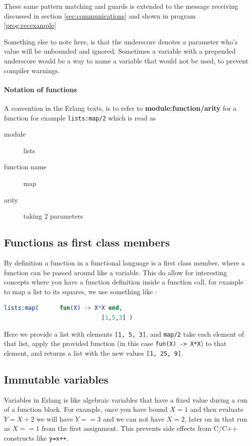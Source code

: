 \documentclass[a4paper,11pt]{report}
\begin{document}
These same pattern matching and guards is extended to the message
receiving discussed in section \autoref{sec:communications} and shown in
program \autoref{prog:recexample}

Something else to note here, is that the underscore denotes a
parameter who's value will be unbounded and ignored. Sometimes a
variable with a prepended underscore would be a way to name a
variable that would not be used, to prevent compiler warnings.

\paragraph{Notation of functions}

A convention in the Erlang texts, is to refer to
\textbf{module:function/arity} for a function for example
\texttt{lists:map/2} which is read as
\begin{description}
\item[module] lists
\item[function name] map
\item[arity] taking 2 parameters
\end{description}

\subsection{Functions as first class members}
\label{sec:func1st}
By definition a function in a functional language is a first class
member, where a function can be passed around like a variable. This do
allow for interesting concepts where you have a function definition
inside a function call, for example to map a list to its squares, we
use something like :
\begin{lstlisting}[language=erlang]
lists:map(		fun(X) -> X*X end,
							[1,5,3] )
\end{lstlisting}

Here we provide a list with elements \texttt{[1, 5, 3]}, and
\texttt{map/2} take each element of that list, apply the provided
function (in this case \texttt{fun(X) -> X*X}) to that element, and
returns a list with the new values \texttt{[1, 25, 9]}.

\subsection{Immutable variables}
\label{sec:imVar}
Variables in Erlang is like algebraic variables that have a fixed
value during a run of a function block. For example, once you have
bound $X=1$ and then evaluate $Y=X+2$ we will have $Y==3$ and we can
not have $X=2$,
later on in that run as $X==1$ from the first assignment. This
prevents side effects from C/C++ constructs like \texttt{y=x++}.
\end{document}
